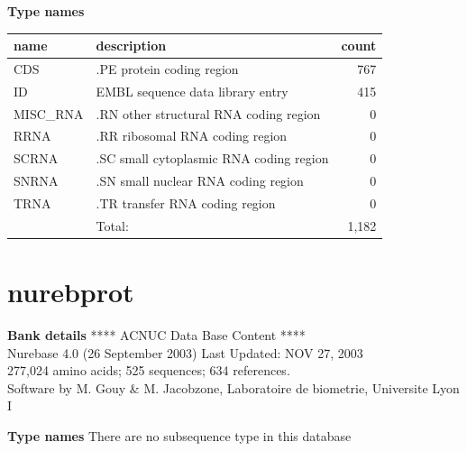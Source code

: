 \documentclass{article}
\begin{document}
\begin{Schunk}
\textbf{Type names}
\noindent\begin{tabular}{llr}
\hline \hline
name & description & count \\
\hline
CDS  &  .PE protein coding region  &  767 \\
ID  &  EMBL sequence data library entry  &  415 \\
MISC\_RNA  &  .RN other structural RNA coding region  &  0 \\
RRNA  &  .RR ribosomal RNA coding region  &  0 \\
SCRNA  &  .SC small cytoplasmic RNA coding region  &  0 \\
SNRNA  &  .SN small nuclear RNA coding region  &  0 \\
TRNA  &  .TR transfer RNA coding region  &  0 \\
\hline
 & Total: & 1,182 \\
\hline \hline
\end{tabular}

\section{ nurebprot }
\textbf{Bank details}
             ****     ACNUC Data Base Content      ****                         \\
         Nurebase 4.0 (26 September 2003) Last Updated: NOV 27, 2003\\
          277,024 amino acids; 525 sequences; 634 references.\\
Software by M. Gouy \& M. Jacobzone, Laboratoire de biometrie, Universite Lyon I 

\textbf{Type names}
There are no subsequence type in this database

\end{Schunk}
\end{document}
